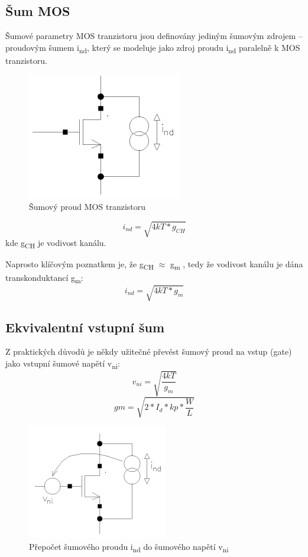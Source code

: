 \subsection{Šum MOS}
Šumové parametry MOS tranzistoru jsou definovány jediným šumovým zdrojem – proudovým šumem i\textsubscript{nd}, který se modeluje jako zdroj proudu i\textsubscript{nd} paralelně k MOS tranzistoru.

\begin{figure}[h]
   \begin{center}
     \includegraphics[scale=0.5]{images/sumMOS.png}
   \end{center}
   \caption{Šumový proud MOS tranzistoru}
\end{figure}
\begin{equation}
i_{nd}=\sqrt{4kT*g_{CH}}
\end{equation}
 kde g\textsubscript{CH} je vodivost kanálu.
 
Naprosto klíčovým poznatkem je, že g\textsubscript{CH} $\approx$ g\textsubscript{m} , tedy že vodivost kanálu je dána transkonduktancí g\textsubscript{m}:
\begin{equation}
i_{nd}=\sqrt{4kT*g_{m}}
\end{equation}
\subsection*{Ekvivalentní vstupní šum}
Z praktických důvodů je někdy užitečné převést šumový proud na vstup (gate) jako vstupní
šumové napětí v\textsubscript{ni}:
\begin{equation}
v_{ni}=\sqrt{\frac{4kT}{g_{m}}}
\end{equation}
\begin{equation}
gm = \sqrt{2*I_{d}*kp*\frac{W}{L}}
\end{equation}

\begin{figure}[h]
   \begin{center}
     \includegraphics[scale=0.5]{images/sumMOSv.png}
   \end{center}
   \caption{Přepočet šumového proudu i\textsubscript{nd} do šumového napětí v\textsubscript{ni}}
\end{figure}

